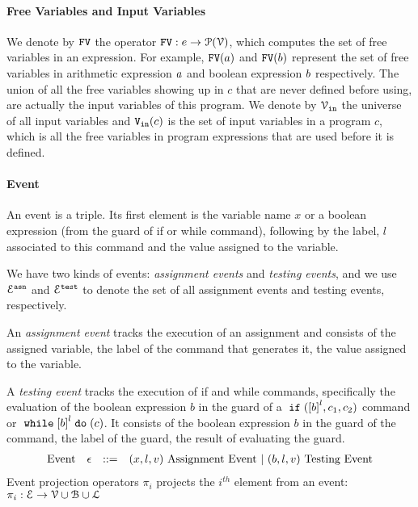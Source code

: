 \paragraph{Free Variables and Input Variables}
  We denote by $\mathtt{FV}$ the operator $\mathtt{FV}: e \to \mathcal{P}(\mathcal{V})$, which computes the set of free variables in an expression. For example,
  $\mathtt{FV}(a)$ and $\mathtt{FV}(b)$ represent the set of free variables in arithmetic
  expression $a$ and boolean expression $b$ respectively.
  The union of all the free variables
  showing up in $c$ that are never defined before using, are actually the input variables of this program.
  We denote by $\mathcal{V}_{\mathtt{\mathtt{in}}}$ the universe of all input variables and ${\mathtt{V_{\mathtt{in}}}}(c)$ is the set of input variables in a program $c$, which is all the free variables
  in program expressions that are used before it is defined.
  
\paragraph{Event}
An event is a triple.
Its first element is the variable name $x$
or a boolean expression (from the guard of if or while command), 
following by 
 the label, $l$ associated to this command and the value assigned to the variable.

 We have two kinds of events: \emph{assignment events} and \emph{testing events},
 and we use $\mathcal{E}^{\mathtt{{asn}}}$ and $\mathcal{E}^{\mathtt{{test}}}$ to denote the set of all assignment events and testing events, respectively.

 An \emph{assignment event} tracks the execution of an assignment and consists of the assigned variable, the label of the command that generates it, the value assigned to the variable.

 A \emph{testing event} tracks the execution of if and while commands, specifically the evaluation of the boolean expression $b$ in the guard of a $\eif(\clabel{b}^l, c_1, c_2)$ command or $\ewhile \clabel{b}^l \edo (c)$.
 It consists of the boolean expression $b$ in the guard of the command, the label of the guard, the result of evaluating the guard.
%
\[
\begin{array}{llll}
  \mbox{Event} 
  & \mathtt{\epsilon} & ::= & 
  ({x}, l, v) ~ \mbox{Assignment Event} 
  ~|~(b, l, v) ~ \mbox{Testing Event}
\end{array}
\]
Event projection operators $\pi_i$ projects the $i^{th}$ element from an event: 
$\pi_i : \mathcal{E} \to \mathcal{V} \cup \mathcal{B} \cup \mathcal{L} $

